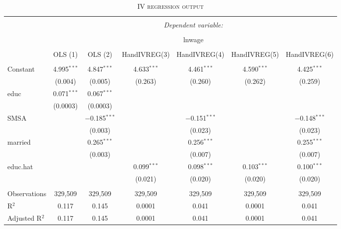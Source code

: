 \documentclass[a4paper]{article}
\begin{document}
\begin{table}[!htbp] \centering 
\begin{adjustwidth}{0.cm}{-0cm}
\begin{threeparttable}
\small
\captionsetup{font=small, justification=raggedright,singlelinecheck=false}
\caption{\textsc{IV regression output}}
\centering 
  \label{}
\small 
\begin{tabular}{@{\extracolsep{-5pt}}lcccccc} 
\\[-5.8ex]\hline 
\hline \\[-1.8ex] 
 & \multicolumn{6}{c}{\textit{Dependent variable:}} \\ 
\cline{2-7} 
\\[-1.8ex] & \multicolumn{6}{c}{lnwage} \\ 
\\[-1.8ex] & OLS (1) & OLS (2) & HandIVREG(3) & HandIVREG(4) & HandIVREG(5) & HandIVREG(6)\\ 
\hline \\[-1.8ex] 
 Constant & 4.995$^{***}$ & 4.847$^{***}$ & 4.633$^{***}$ & 4.461$^{***}$ & 4.590$^{***}$ & 4.425$^{***}$ \\ 
  & (0.004) & (0.005) & (0.263) & (0.260) & (0.262) & (0.259) \\ 
  educ & 0.071$^{***}$ & 0.067$^{***}$ &  &  &  &  \\ 
  & (0.0003) & (0.0003) &  &  &  &  \\ 
  SMSA &  & $-$0.185$^{***}$ &  & $-$0.151$^{***}$ &  & $-$0.148$^{***}$ \\ 
  &  & (0.003) &  & (0.023) &  & (0.023) \\ 
  married &  & 0.265$^{***}$ &  & 0.256$^{***}$ &  & 0.255$^{***}$ \\ 
  &  & (0.003) &  & (0.007) &  & (0.007) \\ 
  educ.hat &  &  & 0.099$^{***}$ & 0.098$^{***}$ & 0.103$^{***}$ & 0.100$^{***}$ \\ 
  &  &  & (0.021) & (0.020) & (0.020) & (0.020) \\ 
 \hline \\[-1.8ex] 
Observations & 329,509 & 329,509 & 329,509 & 329,509 & 329,509 & 329,509 \\ 
R$^{2}$ & 0.117 & 0.145 & 0.0001 & 0.041 & 0.0001 & 0.041 \\ 
Adjusted R$^{2}$ & 0.117 & 0.145 & 0.0001 & 0.041 & 0.0001 & 0.041 \\ 

\end{tabular}
\end{threeparttable}
\end{adjustwidth}
\end{table}
\end{document}
